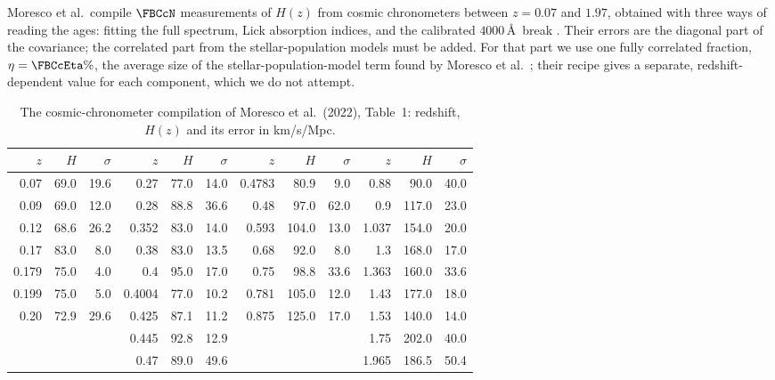 Moresco et al.\ compile $\FBCcN$ measurements of $H(z)$ from cosmic chronometers between
$z=0.07$ and $1.97$, obtained with three ways of reading the ages: fitting the full
spectrum, Lick absorption indices, and the calibrated $4000$\,\AA\ break
\cite[Table~1]{Moresco2022}. Their errors are the diagonal part of the covariance; the
correlated part from the stellar-population models must be added. For that part we
use one fully correlated fraction, $\eta=\FBCcEta\%$, the average size of the
stellar-population-model term found by Moresco et al.\ \cite{Moresco2020}; their recipe
gives a separate, redshift-dependent value for each component, which we do not
attempt.

\begin{table}[htbp]
\centering
\small
\begin{tabular}{@{}rrr@{\hspace{1.6em}}rrr@{\hspace{1.6em}}rrr@{\hspace{1.6em}}rrr@{}}
\toprule
$z$ & $H$ & $\sigma$ & $z$ & $H$ & $\sigma$ & $z$ & $H$ & $\sigma$ & $z$ & $H$ & $\sigma$\\
\midrule
0.07  & 69.0 & 19.6 & 0.27  & 77.0 & 14.0 & 0.4783 & 80.9 & 9.0  & 0.88  & 90.0  & 40.0\\
0.09  & 69.0 & 12.0 & 0.28  & 88.8 & 36.6 & 0.48   & 97.0 & 62.0 & 0.9   & 117.0 & 23.0\\
0.12  & 68.6 & 26.2 & 0.352 & 83.0 & 14.0 & 0.593  & 104.0 & 13.0 & 1.037 & 154.0 & 20.0\\
0.17  & 83.0 & 8.0  & 0.38  & 83.0 & 13.5 & 0.68   & 92.0 & 8.0  & 1.3   & 168.0 & 17.0\\
0.179 & 75.0 & 4.0  & 0.4   & 95.0 & 17.0 & 0.75   & 98.8 & 33.6 & 1.363 & 160.0 & 33.6\\
0.199 & 75.0 & 5.0  & 0.4004 & 77.0 & 10.2 & 0.781 & 105.0 & 12.0 & 1.43  & 177.0 & 18.0\\
0.20  & 72.9 & 29.6 & 0.425 & 87.1 & 11.2 & 0.875  & 125.0 & 17.0 & 1.53  & 140.0 & 14.0\\
      &      &      & 0.445 & 92.8 & 12.9 & & & & 1.75 & 202.0 & 40.0\\
      &      &      & 0.47  & 89.0 & 49.6 & & & & 1.965 & 186.5 & 50.4\\
\bottomrule
\end{tabular}
\caption{The cosmic-chronometer compilation of Moresco et al.\ (2022), Table~1: redshift,
$H(z)$ and its error in km/s/Mpc.}
\label{11c:tab:cc-data}
\end{table}

